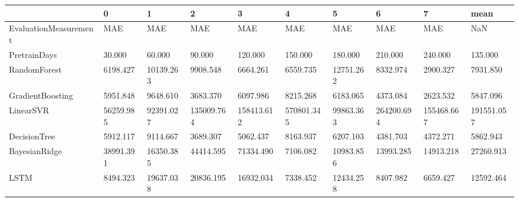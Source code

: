 \begin{tabular}{llllllllll}
\toprule
{} &         0 &         1 &          2 &          3 &          4 &         5 &          6 &          7 &       mean \\
\midrule
EvaluationMeasurement &       MAE &       MAE &        MAE &        MAE &        MAE &       MAE &        MAE &        MAE &        NaN \\
PretrainDays          &    30.000 &    60.000 &     90.000 &    120.000 &    150.000 &   180.000 &    210.000 &    240.000 &    135.000 \\
RandomForest          &  6198.427 & 10139.263 &   9908.548 &   6664.261 &   6559.735 & 12751.262 &   8332.974 &   2900.327 &   7931.850 \\
GradientBoosting      &  5951.848 &  9648.610 &   3683.370 &   6097.986 &   8215.268 &  6183.065 &   4373.084 &   2623.532 &   5847.096 \\
LinearSVR             & 56259.985 & 92391.027 & 135009.764 & 158413.612 & 570801.345 & 99863.363 & 264200.694 & 155468.667 & 191551.057 \\
DecisionTree          &  5912.117 &  9114.667 &   3689.307 &   5062.437 &   8163.937 &  6207.103 &   4381.703 &   4372.271 &   5862.943 \\
BayesianRidge         & 38991.391 & 16350.385 &  44414.595 &  71334.490 &   7106.082 & 10983.856 &  13993.285 &  14913.218 &  27260.913 \\
LSTM                  &  8494.323 & 19637.038 &  20836.195 &  16932.034 &   7338.452 & 12434.258 &   8407.982 &   6659.427 &  12592.464 \\
\bottomrule
\end{tabular}
